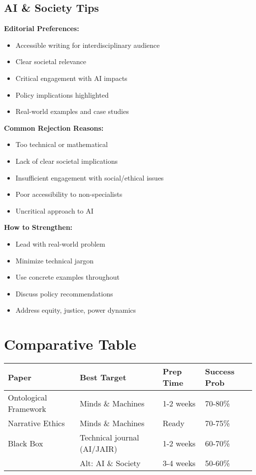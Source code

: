 \documentclass[12pt]{article}
\begin{document}
\subsection{AI \& Society Tips}

\textbf{Editorial Preferences:}
\begin{itemize}[leftmargin=*]
\item Accessible writing for interdisciplinary audience
\item Clear societal relevance
\item Critical engagement with AI impacts
\item Policy implications highlighted
\item Real-world examples and case studies
\end{itemize}

\textbf{Common Rejection Reasons:}
\begin{itemize}[leftmargin=*]
\item Too technical or mathematical
\item Lack of clear societal implications
\item Insufficient engagement with social/ethical issues
\item Poor accessibility to non-specialists
\item Uncritical approach to AI
\end{itemize}

\textbf{How to Strengthen:}
\begin{itemize}[leftmargin=*]
\item Lead with real-world problem
\item Minimize technical jargon
\item Use concrete examples throughout
\item Discuss policy recommendations
\item Address equity, justice, power dynamics
\end{itemize}

\section{Comparative Table}

\begin{center}
\small
\begin{tabular}{|p{3cm}|p{3.5cm}|p{3.5cm}|p{3.5cm}|}
\hline
\textbf{Paper} & \textbf{Best Target} & \textbf{Prep Time} & \textbf{Success Prob} \\
\hline
Ontological Framework & Minds \& Machines & 1-2 weeks & 70-80\% \\
\hline
Narrative Ethics & Minds \& Machines & Ready & 70-75\% \\
\hline
Black Box & Technical journal (AI/JAIR) & 1-2 weeks & 60-70\% \\
& Alt: AI \& Society & 3-4 weeks & 50-60\% \\
\hline
\end{tabular}
\end{center}
\end{document}
